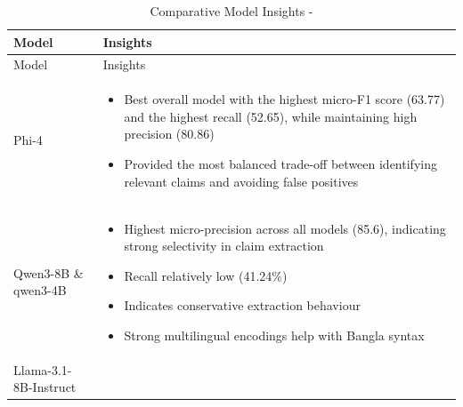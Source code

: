 \documentclass[]{article}
\begin{document}
\begin{longtable}[]{@{}
  >{\raggedright\arraybackslash}p{}
  >{\raggedright\arraybackslash}p{}@{}}
\caption{Comparative Model Insights -}\tabularnewline
\toprule\noalign{}
\begin{minipage}[b]{\linewidth}\raggedright
Model
\end{minipage} & \begin{minipage}[b]{\linewidth}\raggedright
Insights
\end{minipage} \\
\midrule\noalign{}
\endfirsthead
\toprule\noalign{}
\begin{minipage}[b]{\linewidth}\raggedright
Model
\end{minipage} & \begin{minipage}[b]{\linewidth}\raggedright
Insights
\end{minipage} \\
\midrule\noalign{}
\endhead
\bottomrule\noalign{}
\endlastfoot
Phi-4 & \begin{minipage}[t]{\linewidth}\raggedright
\begin{itemize}
\item
  Best overall model with the highest micro-F1 score (63.77) and the
  highest recall (52.65), while maintaining high precision (80.86)
\item
  Provided the most balanced trade-off between identifying relevant
  claims and avoiding false positives
\end{itemize}
\end{minipage} \\
Qwen3-8B \& qwen3-4B & \begin{minipage}[t]{\linewidth}\raggedright
\begin{itemize}
\item
  Highest micro-precision across all models (85.6), indicating strong
  selectivity in claim extraction
\item
  Recall relatively low (41.24\%)
\item
  Indicates conservative extraction behaviour
\item
  Strong multilingual encodings help with Bangla syntax
\end{itemize}
\end{minipage} \\
Llama-3.1-8B-Instruct &
\begin{minipage}[t]{\linewidth}\raggedright
\begin{itemize}

\end{itemize}
\end{minipage}
\end{longtable}
\end{document}
